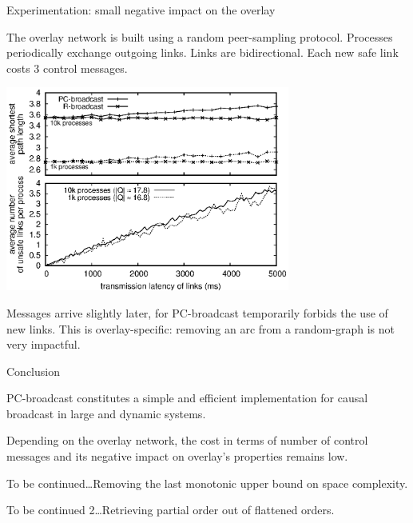 \documentclass[10pt, xcolor={usenames, dvipsnames}]{beamer}
\begin{document}
\begin{frame}{Experimentation: small negative impact on the overlay}

  \small The overlay network is built using a random peer-sampling protocol. Processes
  periodically exchange outgoing links. Links are bidirectional. Each new safe
  link costs 3 control messages.

  \vspace{-5pt}

  \begin{center}
    \includegraphics[width=0.7\textwidth]{img/delay.eps}
  \end{center}
  
  \vspace{-5pt}

  \small Messages arrive slightly later, for PC-broadcast temporarily forbids the use
  of new links. This is overlay-specific: removing an arc from a random-graph is
  not very impactful.

\end{frame}

\begin{frame}{Conclusion}
  
  PC-broadcast constitutes a simple and efficient implementation for causal broadcast
  in large and dynamic systems.

  Depending on the overlay network, the cost in terms of number of control
  messages and its negative impact on overlay's properties remains low.

  \vspace{2em}

  \begin{center}
  \begin{table}
    \begin{center}
      
    \end{center}
  \end{table}
  \end{center}


\end{frame}

\begin{frame}[standout]
  To be continued\ldots Removing the last monotonic upper bound on space complexity.
\end{frame}

\begin{frame}[standout]
  To be continued 2\ldots Retrieving partial order out of flattened orders.
\end{frame}
\end{document}
